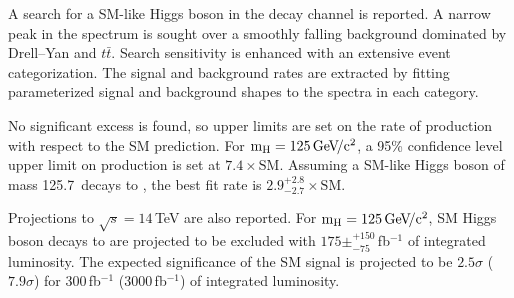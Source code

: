 \documentclass[10pt]{article}
\def\Acknowledgements{\bigskip  \bigskip \begin{center} \begin{large}
             \bf ACKNOWLEDGEMENTS \end{large}\end{center}}
\begin{document}
A search for a SM-like Higgs boson in the \mm{} decay channel is reported.
A narrow \hmm{} peak in the \Mmumu{} spectrum is sought over a smoothly
falling background dominated by Drell--Yan and $t\bar{t}$.  Search
sensitivity is enhanced with an extensive event categorization.  The
signal and background rates are extracted by fitting parameterized
signal and background shapes to the \Mmumu{} spectra in each category.

No significant excess is found, so upper limits are set on the
rate of \hmm{} production with respect to the SM prediction.
For $\mathrm{m_H}{}=125\,\mathrm{Ge\kern -0.1em V\!/c^2}{}$, a 95\% confidence level upper limit
on \hmm{} production is set at $7.4\times\mathrm{SM}$.
Assuming a SM-like Higgs boson of mass 125.7\,\GeVcc{} decays to \mm{},
the best fit rate is $2.9^{+2.8}_{-2.7}\times\mathrm{SM}$.

Projections to $\sqrt{s}=14$\,TeV are also reported.  For $\mathrm{m_H}{}=125\,\mathrm{Ge\kern -0.1em V\!/c^2}{}$,
SM Higgs boson decays to \mm{} are projected to be excluded with
$175\pm^{+150}_{-75}$\,fb$^{-1}$ of integrated luminosity.  The expected significance
of the SM \hmm{} signal is projected to be 
$2.5\sigma$ ($7.9\sigma$) for 300\,fb$^{-1}$ (3000\,fb$^{-1}$) of integrated luminosity.

\end{document}
